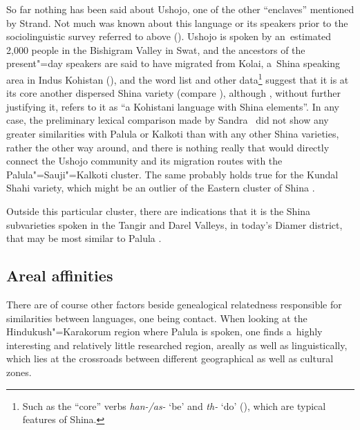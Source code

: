 So far nothing has been said about Ushojo, one of the other ``enclaves'' mentioned by Strand. Not much was known about this language or its speakers prior to the sociolinguistic survey referred to above (\citealt{decker1992}). Ushojo is spoken by an~estimated 2,000 people in the Bishigram Valley in Swat, and the ancestors of the present"=day speakers are said to have migrated from Kolai, a~Shina speaking area in Indus Kohistan (\citealt[69]{decker1992}), and the word list and other data\footnote{Such as the ``core'' verbs \textit{han-/as-} `be' and \textit{th-} `do' (\citealt[ 71--72, 199--203]{decker1992}), which are typical features of Shina.} suggest that it is at its core another dispersed Shina variety (compare \citealt[255]{strand2001}), although \citet[9]{zoller2005}, without further justifying it, refers to it as ``a Kohistani language with Shina elements''. In any case, the preliminary lexical comparison made by Sandra~\citet[70]{decker1992} did not show any greater similarities with Palula or Kalkoti than with any other Shina varieties, rather the other way around, and there is nothing really that would directly connect the Ushojo community and its migration routes with the Palula"=Sauji"=Kalkoti cluster. The same probably holds true for the Kundal Shahi variety, which might be an outlier of the Eastern cluster of Shina \citep[9]{baartrehman2005}.


Outside this particular cluster, there are indications that it is the Shina subvarieties spoken in the Tangir and Darel Valleys, in today's Diamer district, that may be most similar to Palula \citep[142--143]{radloff1992}. 


\subsection{Areal affinities}
\label{subsec:1-3-2}

There are of course other factors beside genealogical relatedness responsible for similarities between languages, one being contact. When looking at the Hindukush"=Karakorum region where Palula is spoken, one finds a~highly interesting and relatively little researched region, areally as well as linguistically, which lies at the crossroads between different geographical as well as cultural zones. 


